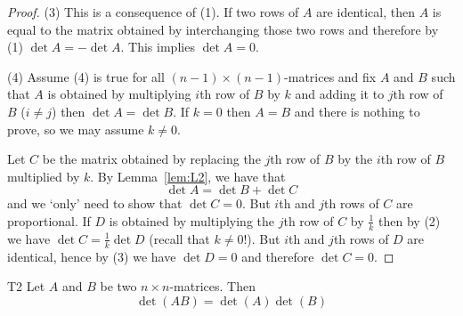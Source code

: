 \begin{proof}
  (3) This is a consequence of (1). If two rows of $A$ are identical,
  then $A$ is equal to the matrix obtained by interchanging those two
  rows and therefore by (1) $\det A=-\det A$. This implies $\det A=0$.

  (4) Assume (4) is true for all $(n-1)\times (n-1)$-matrices and fix
  $A$ and $B$ such that $A$ is obtained by multiplying $i$th row of
  $B$ by $k$ and adding it to $j$th row of $B$ ($i\neq j$) then
  $\det A=\det B$.  If $k=0$ then $A=B$ and there is nothing to prove,
  so we may assume $k\neq 0$.

  Let $C$ be the matrix obtained by replacing the $j$th row of $B$ by
  the $i$th row of $B$ multiplied by $k$.  By Lemma~\ref{lem:L2}, we
  have that
  \begin{equation*}
    \det A=\det B+\det C
  \end{equation*}
  and we `only' need to show that $\det C=0$. But $i$th and $j$th rows
  of $C$ are proportional. If $D$ is obtained by multiplying the $j$th
  row of $C$ by $\frac 1k$ then by (2) we have $\det C=\frac 1k\det D$
  (recall that $k\neq 0$!).  But $i$th and $j$th rows of $D$ are
  identical, hence by (3) we have $\det D=0$ and therefore $\det C=0$.
\end{proof}

\begin{theorem}{}{T2}
  Let $A$ and $B$ be two $n\times
  n$-matrices. Then
  \begin{equation*}
    \det (AB) =\det (A) \det (B)
  \end{equation*}
\end{theorem}

